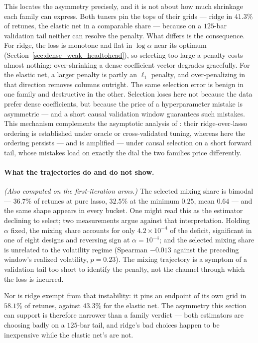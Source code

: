 This locates the asymmetry precisely, and it is not about how much
shrinkage each family can express. Both tuners pin the tops of their
grids --- ridge in $41.3\%$ of retunes, the elastic net in a comparable
share --- because on a $125$-bar validation tail neither can resolve the
penalty. What differs is the consequence. For ridge, the loss is
monotone and flat in $\log \alpha$ near its optimum
(Section~\ref{sec:dense_weak_headtohead}), so selecting too large a
penalty costs almost nothing: over-shrinking a dense coefficient vector
degrades gracefully. For the elastic net, a larger penalty is partly an
$\ell_1$ penalty, and over-penalizing in that direction removes columns
outright. The same selection error is benign in one family and
destructive in the other. Selection loses here not because the data
prefer dense coefficients, but because the price of a hyperparameter
mistake is asymmetric --- and a short causal validation window
guarantees such mistakes. This mechanism complements the asymptotic
analysis of \citet{ShenXiu2025}: their ridge-over-lasso ordering is
established under oracle or cross-validated tuning, whereas here the
ordering persists --- and is amplified --- under causal selection on a
short forward tail, whose mistakes load on exactly the dial the two
families price differently.

\paragraph{What the trajectories do and do not show.}
\emph{(Also computed on the first-iteration arms.)} The selected mixing
share is bimodal --- $36.7\%$ of retunes at pure
lasso, $32.5\%$ at the minimum $0.25$, mean $0.64$ --- and the same
shape appears in every bucket. One might read this as the estimator
declining to select; two measurements argue against that
interpretation. Holding $\alpha$ fixed, the mixing share accounts for only
$4.2 \times 10^{-4}$ of the deficit, significant in one of eight designs
and reversing sign at $\alpha = 10^{-4}$; and the selected mixing share
is unrelated to the volatility regime (Spearman $-0.013$ against the
preceding window's realized volatility, $p = 0.23$). The mixing
trajectory is a symptom of a validation tail too short to identify the
penalty, not the channel through which the loss is incurred.

Nor is ridge exempt from that instability: it pins an endpoint of its
own grid in $58.1\%$ of retunes, against $43.3\%$ for the elastic net.
The asymmetry this section can support is therefore narrower than a
family verdict --- both estimators are choosing badly on a $125$-bar
tail, and ridge's bad choices happen to be inexpensive while the
elastic net's are not.

